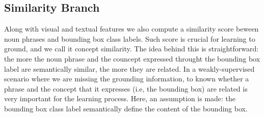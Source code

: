 \subsection{Similarity Branch}

Along with visual and textual features we also compute a similarity
score beween noun phrases and bounding box class labels. Such score is
crucial for learning to ground, and we call it concept similarity. The
idea behind this is straightforward: the more the noun phrase and the
councept expressed throught the bounding box label are semantically
similar, the more they are related. In a weakly-supervised scenario
where we are missing the grounding information, to known whether a
phrase and the concept that it expresses (i.e, the bounding box) are
related is very important for the learning process. Here, an
assumption is made: the bounding box class label semantically define
the content of the bounding box. 

